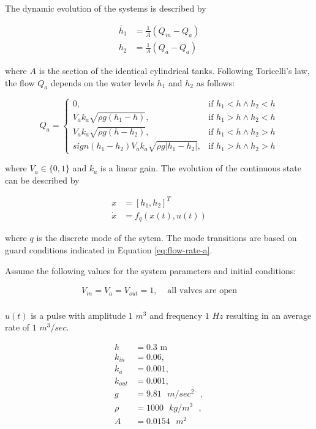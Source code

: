 \documentclass{article}
\begin{document}
The dynamic evolution of the systems is described by

\begin{align}
\dot{h_1} & = \frac{1}{A} (Q_{in} - Q_{a}) \\
\dot{h_2} & = \frac{1}{A} (Q_{a} - Q_{a})
\end{align}

where $A$ is the section of the identical cylindrical tanks.
Following Toricelli's law, the flow $Q_{a}$ depends on
the water levels $h_1$ and $h_2$ as follows:

\begin{equation}
Q_{a}  =
 \begin{cases}
 0,        & \mbox{if } h_1 < h \wedge h_2 < h \\
 V_a k_a \sqrt{\rho g (h_1 - h)}, & \mbox{if } h_1 > h \wedge h_2 < h \\
 V_a k_a \sqrt{\rho g (h - h_2)}, & \mbox{if } h_1 < h \wedge h_2 > h \\
 sign(h_1 - h_2) V_a k_a \sqrt{\rho g |h_1 - h_2|}, & \mbox{if } h_1 > h \wedge h_2 > h
\end{cases}  \label{eq:flow-rate-a}
\end{equation}

where $V_a \in \{0, 1\}$ and $k_a$ is a linear gain.
The evolution of the continuous state can be described by

\begin{align}
x & = [h_1, h_2]^T \\
\dot{x} & = f_q(x(t), u(t))
\end{align}

where $q$ is the discrete mode of the sytem.
The mode transitions are based on guard conditions
indicated in Equation \ref{eq:flow-rate-a}.

Assume the following values for the system parameters and initial conditions:

\begin{align}
 V_{in} = V_{a} = V_{out} = 1, & \mbox{  all valves are open} \\
\end{align}

$u(t)$ is a pulse with amplitude $1$ $m^3$ and frequency $1$ $Hz$
resulting in an average rate of $1$ $m^3/sec$.

\begin{align}
 h &= 0.3 \mbox{ m } \\
 k_{in} &= 0.06, \\
 k_{a} &= 0.001, \\
 k_{out} &= 0.001, \\
 g &= 9.81 \mbox{ $m/sec^2$ }, \\
 \rho& = 1000 \mbox{ $kg/m^3$ }, \\
 A &= 0.0154 \mbox{ $m^2$ }
\end{align}
\end{document}
